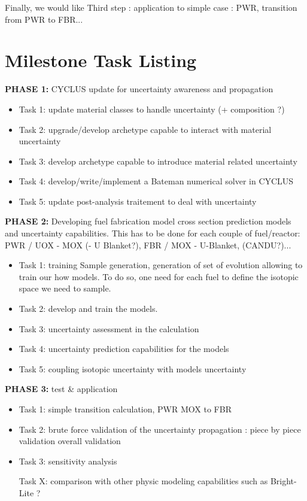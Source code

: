 \documentclass[dvips,12pt]{article}
\begin{document}
Finally, we would like
Third step : application to simple case : PWR, transition from PWR to FBR...

\pagebreak
\section{Milestone Task Listing}

\textbf{PHASE 1:} CYCLUS update for uncertainty awareness and propagation

\begin{itemize}
\item Task 1: update material classes to handle uncertainty (+ composition ?)
\item Task 2: upgrade/develop archetype capable to interact with material uncertainty
\item Task 3: develop archetype capable to introduce material related uncertainty
\item Task 4: develop/write/implement a Bateman numerical solver in CYCLUS
\item Task 5: update post-analysis traitement to deal with uncertainty  
\end{itemize}
 
\textbf{PHASE 2:} Developing fuel fabrication model cross section prediction models and uncertainty capabilities. This has to be done for each couple of fuel/reactor: PWR / UOX - MOX (- U Blanket?), FBR / MOX - U-Blanket, (CANDU?)...
\begin{itemize}
\item Task 1: training Sample generation, generation of set of evolution allowing to train our how models.
To do so, one need for each fuel to define the isotopic space we need to sample. 
\item Task 2: develop and train the models.
\item Task 3: uncertainty assessment in the calculation
\item Task 4: uncertainty prediction capabilities for the models
\item Task 5: coupling isotopic uncertainty with models uncertainty
\end{itemize}
 
\textbf{PHASE 3:} test \& application
\begin{itemize}
\item Task 1: simple transition calculation, PWR MOX to FBR
\item Task 2: brute force validation of the uncertainty propagation :
piece by piece validation
overall validation
\item Task 3: sensitivity analysis

Task X: comparison with other physic modeling capabilities such as Bright-Lite ?
\end{itemize}
 
\end{document}
